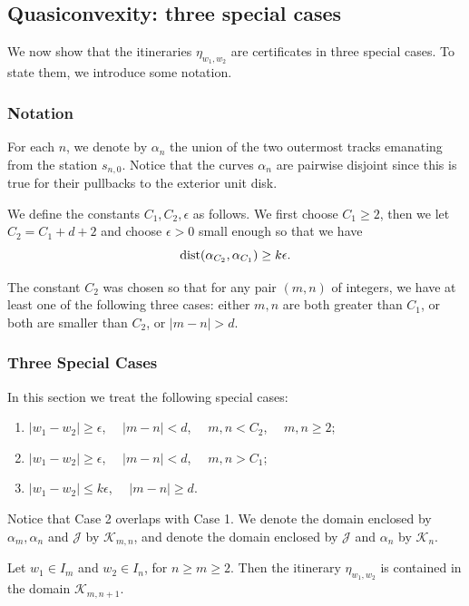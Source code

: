 \subsection{Quasiconvexity: three special cases}

We now show that the itineraries $\eta_{w_1,w_2}$ are certificates in three special cases. To state them, we introduce some notation.

\subsubsection{Notation}
For each $n$, we denote by  $\alpha_n$ the union of the two outermost tracks emanating from the station $s_{n,0}$. 
Notice that the curves $\alpha_n$ are pairwise disjoint since this is true for their pullbacks to the exterior unit disk.

We define the constants $C_1, C_2, \epsilon$ as follows. We first choose $C_1 \ge 2$, then we let $C_2 = C_1 + d+2$ and choose $\epsilon >0$ small enough so that we have 
\begin{equation}
	\operatorname{dist}(\alpha_{C_2}, \alpha_{C_1}) \geq k \epsilon.
\end{equation}

The constant $C_2$ was chosen so that for any pair $(m,n)$ of integers, we have at least one of the following three cases: either $m,n$ are both greater than $C_1$, or both are smaller than $C_2$, or $|m-n| > d$.

\subsubsection{Three Special Cases}
In this section we treat the following special cases:
\begin{enumerate}
	\item $|w_1-w_2| \geq  \epsilon$, $\quad |m-n|<d$, $\quad m,n < C_2$, $\quad m,n \geq 2$; %
	\item $|w_1-w_2| \geq \epsilon$, $\quad |m-n|<d$, $\quad  m,n> C_1$; %
	\item $|w_1-w_2| \leq k \epsilon$, $\quad |m-n| \geq d$.
\end{enumerate}

Notice that Case 2 overlaps with Case 1.
 We denote the domain enclosed by $\alpha_m, \alpha_n$ and $\mathcal J$ by $\mathcal K_{m,n}$, and denote the domain enclosed by $\mathcal J$ and $\alpha_n$ by $\mathcal K_n$.

\begin{lemma}
Let $w_1 \in I_m$ and $w_2 \in I_n$, for $n \geq m \geq 2$. Then the itinerary $\eta_{w_1,w_2}$ is contained in the domain $\mathcal K_{m,n+1}$.
\end{lemma}

